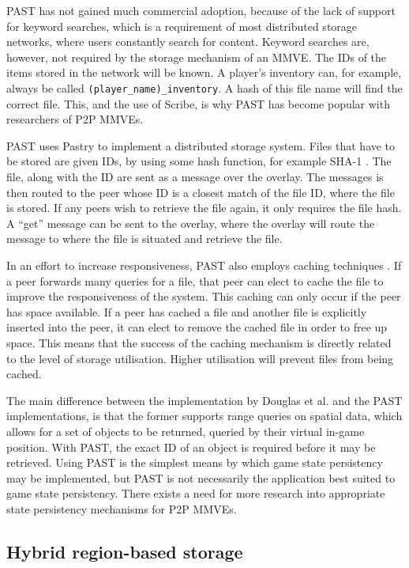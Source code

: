 PAST has not gained much commercial adoption, because of the lack of support for keyword searches, which is a requirement of most distributed storage networks, where users constantly search for content. Keyword searches are, however, not required by the storage mechanism of an MMVE. The IDs of the items stored in the network will be known. A player's inventory can, for example, always be called \verb.(player_name)_inventory.. A hash of this file name will find the correct file. This, and the use of Scribe, is why PAST has become popular with researchers of P2P MMVEs.

PAST \cite{PAST_storage} uses Pastry to implement a distributed storage system. Files that have to be stored are given IDs, by using some hash function, for example SHA-1 \cite{SHA}. The file, along with the ID are sent as a message over the overlay. The messages is then routed to the peer whose ID is a closest match of the file ID, where the file is stored. If any peers wish to retrieve the file again, it only requires the file hash. A ``get'' message can be sent to the overlay, where the overlay will route the message to where the file is situated and retrieve the file.

In an effort to increase responsiveness, PAST also employs caching techniques \cite{storage_and_chaching_PAST}. If a peer forwards many queries for a file, that peer can elect to cache the file to improve the responsiveness of the system. This caching can only occur if the peer has space available. If a peer has cached a file and another file is explicitly inserted into the peer, it can elect to remove the cached file in order to free up space. This means that the success of the caching mechanism is directly related to the level of storage utilisation. Higher utilisation will prevent files
from being cached.

The main difference between the implementation by Douglas et al. and the PAST implementations, is that the former supports range queries on spatial data, which allows for a set of objects to be returned, queried by their virtual in-game position. With PAST, the exact ID of an object is required before it may be retrieved. Using PAST is the simplest means by which game state persistency may be implemented, but PAST is not necessarily the application best suited to game state persistency. There exists a need for more research into appropriate state persistency mechanisms for P2P MMVEs.

\subsection{Hybrid region-based storage}
\label{hybrid_storage}

